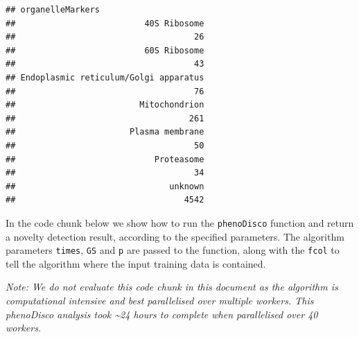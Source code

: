 \begin{Shaded}
\begin{Highlighting}[]
 \NormalTok{)}
\end{Highlighting}
\end{Shaded}

\begin{verbatim}
## organelleMarkers
##                          40S Ribosome 
##                                    26 
##                          60S Ribosome 
##                                    43 
## Endoplasmic reticulum/Golgi apparatus 
##                                    76 
##                         Mitochondrion 
##                                   261 
##                       Plasma membrane 
##                                    50 
##                            Proteasome 
##                                    34 
##                               unknown 
##                                  4542
\end{verbatim}

In the code chunk below we show how to run the \texttt{phenoDisco}
function and return a novelty detection result, according to the
specified parameters. The algorithm parameters \texttt{times},
\texttt{GS} and \texttt{p} are passed to the function, along with the
\texttt{fcol} to tell the algorithm where the input training data is
contained.

\begin{Shaded}
\begin{Highlighting}[]
\StringTok{ } \NormalTok{, }
                  \NormalTok{, }
                  \NormalTok{)}
\end{Highlighting}
\end{Shaded}

\emph{Note: We do not evaluate this code chunk in this document as the
algorithm is computational intensive and best parallelised over multiple
workers. This phenoDisco analysis took \textasciitilde{}24 hours to
complete when parallelised over 40 workers.}

